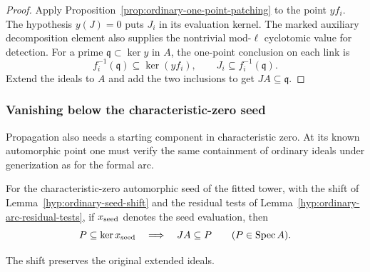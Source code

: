 \begin{proof}
Apply Proposition~\ref{prop:ordinary-one-point-patching} to the point
\(y f_i\).  The hypothesis \(y(J)=0\)
puts \(J_i\) in its evaluation kernel. The marked auxiliary
decomposition element also supplies the nontrivial
mod-\(\ell\) cyclotomic value for detection. For a prime \(\mathfrak q\subset\ker y\) in \(A\), the
one-point conclusion on each link is
\[
    f_i^{-1}(\mathfrak q)\subseteq\ker(yf_i),\qquad
    J_i\subseteq f_i^{-1}(\mathfrak q).
\]
Extend the ideals to \(A\) and add the two inclusions to get
\(JA\subseteq\mathfrak q\).

\end{proof}

\subsubsection{Vanishing below the characteristic-zero seed}\label{par:count-two-seed-support}

Propagation also needs a starting component in characteristic zero. At its known automorphic point one must verify the same containment of ordinary ideals under generization as for the formal arc.

\begin{proposition}\label{prop:tower-below-seed}
For the characteristic-zero automorphic seed of the fitted tower,
with the shift of Lemma~\ref{hyp:ordinary-seed-shift}
and the residual tests of Lemma~\ref{hyp:ordinary-arc-residual-tests},
if \(x_{\rm seed}\) denotes the seed evaluation, then 
\[
 P\subseteq\ker x_{\rm seed}\quad\Longrightarrow\quad JA\subseteq P\qquad(P\in\operatorname{Spec}A).
\]

The shift preserves the original extended ideals.
\end{proposition}


